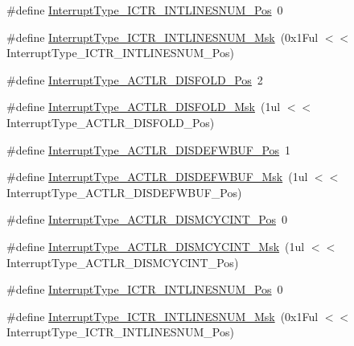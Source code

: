 \begin{DoxyCompactItemize}
\item 
\#define \hyperlink{group___c_m_s_i_s___c_m3___interrupt_type_ga5d164b3cb981bd85afd35892d180a5c3}{Interrupt\-Type\-\_\-\-I\-C\-T\-R\-\_\-\-I\-N\-T\-L\-I\-N\-E\-S\-N\-U\-M\-\_\-\-Pos}~0
\item 
\#define \hyperlink{group___c_m_s_i_s___c_m3___interrupt_type_ga0a2c325cefdab97bd8ce3336a66a803e}{Interrupt\-Type\-\_\-\-I\-C\-T\-R\-\_\-\-I\-N\-T\-L\-I\-N\-E\-S\-N\-U\-M\-\_\-\-Msk}~(0x1\-Ful $<$$<$ Interrupt\-Type\-\_\-\-I\-C\-T\-R\-\_\-\-I\-N\-T\-L\-I\-N\-E\-S\-N\-U\-M\-\_\-\-Pos)
\item 
\#define \hyperlink{group___c_m_s_i_s___c_m3___interrupt_type_gaaa37f212111e6dbc9505d46b8bf8fa3e}{Interrupt\-Type\-\_\-\-A\-C\-T\-L\-R\-\_\-\-D\-I\-S\-F\-O\-L\-D\-\_\-\-Pos}~2
\item 
\#define \hyperlink{group___c_m_s_i_s___c_m3___interrupt_type_gac4d872ecfcf7dcb93f98824ada52a527}{Interrupt\-Type\-\_\-\-A\-C\-T\-L\-R\-\_\-\-D\-I\-S\-F\-O\-L\-D\-\_\-\-Msk}~(1ul $<$$<$ Interrupt\-Type\-\_\-\-A\-C\-T\-L\-R\-\_\-\-D\-I\-S\-F\-O\-L\-D\-\_\-\-Pos)
\item 
\#define \hyperlink{group___c_m_s_i_s___c_m3___interrupt_type_ga46fed31841c33811db8b3a9cbae6347b}{Interrupt\-Type\-\_\-\-A\-C\-T\-L\-R\-\_\-\-D\-I\-S\-D\-E\-F\-W\-B\-U\-F\-\_\-\-Pos}~1
\item 
\#define \hyperlink{group___c_m_s_i_s___c_m3___interrupt_type_ga3cecf9e9d75112aed3ed055343cbe23f}{Interrupt\-Type\-\_\-\-A\-C\-T\-L\-R\-\_\-\-D\-I\-S\-D\-E\-F\-W\-B\-U\-F\-\_\-\-Msk}~(1ul $<$$<$ Interrupt\-Type\-\_\-\-A\-C\-T\-L\-R\-\_\-\-D\-I\-S\-D\-E\-F\-W\-B\-U\-F\-\_\-\-Pos)
\item 
\#define \hyperlink{group___c_m_s_i_s___c_m3___interrupt_type_ga101a93632e4480073299b775bc5cbf12}{Interrupt\-Type\-\_\-\-A\-C\-T\-L\-R\-\_\-\-D\-I\-S\-M\-C\-Y\-C\-I\-N\-T\-\_\-\-Pos}~0
\item 
\#define \hyperlink{group___c_m_s_i_s___c_m3___interrupt_type_ga0c020eb28544979bfac2e219ed53c999}{Interrupt\-Type\-\_\-\-A\-C\-T\-L\-R\-\_\-\-D\-I\-S\-M\-C\-Y\-C\-I\-N\-T\-\_\-\-Msk}~(1ul $<$$<$ Interrupt\-Type\-\_\-\-A\-C\-T\-L\-R\-\_\-\-D\-I\-S\-M\-C\-Y\-C\-I\-N\-T\-\_\-\-Pos)
\item 
\#define \hyperlink{group___c_m_s_i_s___c_m3___interrupt_type_ga5d164b3cb981bd85afd35892d180a5c3}{Interrupt\-Type\-\_\-\-I\-C\-T\-R\-\_\-\-I\-N\-T\-L\-I\-N\-E\-S\-N\-U\-M\-\_\-\-Pos}~0
\item 
\#define \hyperlink{group___c_m_s_i_s___c_m3___interrupt_type_ga0a2c325cefdab97bd8ce3336a66a803e}{Interrupt\-Type\-\_\-\-I\-C\-T\-R\-\_\-\-I\-N\-T\-L\-I\-N\-E\-S\-N\-U\-M\-\_\-\-Msk}~(0x1\-Ful $<$$<$ Interrupt\-Type\-\_\-\-I\-C\-T\-R\-\_\-\-I\-N\-T\-L\-I\-N\-E\-S\-N\-U\-M\-\_\-\-Pos)
$$
\end{DoxyCompactItemize}
